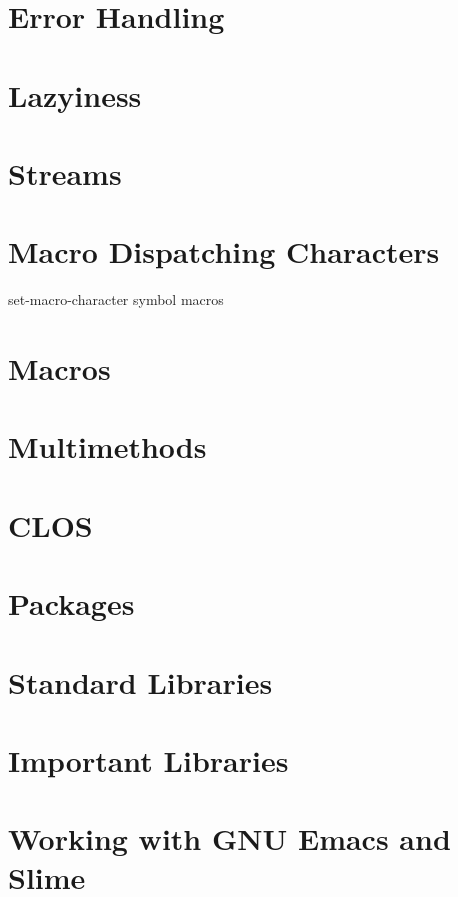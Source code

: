 \documentclass[11pt]{article}
\begin{document}
\section{Error Handling}
\label{sec-11}
\section{Lazyiness}
\label{sec-12}
\section{Streams}
\label{sec-13}
\section{Macro Dispatching Characters}
\label{sec-14}
set-macro-character
symbol macros
\section{Macros}
\label{sec-15}
\section{Multimethods}
\label{sec-16}
\section{CLOS}
\label{sec-17}
\section{Packages}
\label{sec-18}
\section{Standard Libraries}
\label{sec-19}
\section{Important Libraries}
\label{sec-20}
\section{Working with GNU Emacs and Slime}
\label{sec-21}
\end{document}
